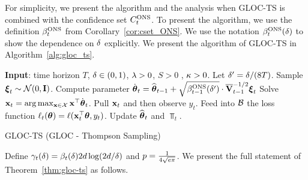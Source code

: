 For simplicity, we present the algorithm and the analysis when GLOC-TS is combined with the confidence set $C^{{\text{\normalfont ONS}}}_t$.
To present the algorithm, we use the definition $\beta_t^{{\text{\normalfont ONS}}}$ from Corollary~\ref{cor:cset_ONS}. %
We use the notation $\beta_{t}^{{\text{\normalfont ONS}}}({\delta})$ to show the dependence on ${\delta}$ explicitly.
We present the algorithm of GLOC-TS in Algorithm~\ref{alg:gloc_ts}.
\begin{algorithm}[h]
  \begin{algorithmic}[1]
    \STATE \textbf{Input}: time horizon $T$, ${\delta} \in(0,1)$, ${\lambda}>0$, $S>0$ , ${\kappa}>0$.
    \STATE Let ${\delta}' = {\delta}/(8T)$.
      \STATE Sample ${{\boldsymbol\xi}}_t \sim \mathcal{N}(0, \mathbf{I})$.
      \STATE Compute parameter $\dot{{{\boldsymbol \theta}}}_t = {{\widehat{\boldsymbol \theta}}}_{t-1} + \sqrt{\beta^{{\text{\normalfont ONS}}}_{t-1}({\delta}')}\cdot\overline{\mathbf{V}}_{t-1}^{-1/2} {{\boldsymbol\xi}}_t $
      \STATE Solve $\mathbf{x}_t = \arg \max_{\mathbf{x}\in\mathcal{X}} \mathbf{x}^{\top}\dot{{{\boldsymbol \theta}}}_t$.
      \STATE Pull $\mathbf{x}_t$ and then observe $y_t$.
      \STATE Feed into $\mathcal{B}$ the loss function $\ell_t({{\boldsymbol \theta}}) = \ell(\mathbf{x}_t^{\top} {{\boldsymbol \theta}}, y_t)$.
      \STATE Update ${{\widehat{\boldsymbol \theta}}}_t$ and $\barV_t$.
    \ENDFOR
  \end{algorithmic}
  \caption{GLOC-TS (GLOC - Thompson Sampling)}
  \label{alg:gloc_ts}
\end{algorithm}

Define ${\gamma}_t({\delta}) = \beta_t({\delta}) 2 d \log(2d/{\delta})$ and $p={ \frac{1}{4\sqrt{e\pi}} }$.
We present the full statement of Theorem~\ref{thm:gloc-ts} as follows.

